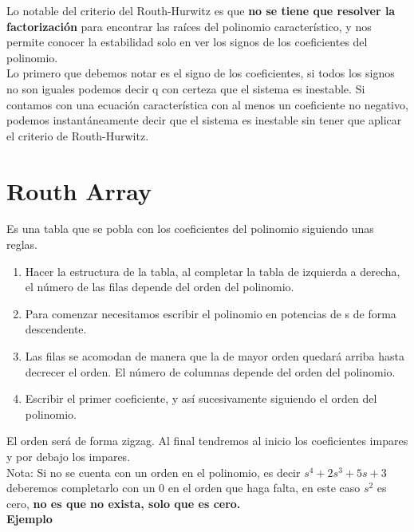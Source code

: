 \documentclass[
	12pt, %
]{fphw}
\begin{document}
Lo notable del criterio del Routh-Hurwitz es que \textbf{no se tiene que resolver la factorización} para encontrar las raíces del polinomio característico, y nos permite conocer la estabilidad solo en ver los signos de los coeficientes del polinomio.\\
Lo primero que debemos notar es el signo de los coeficientes, si todos los signos no son iguales podemos decir q con certeza que el sistema es inestable. 
Si contamos con una ecuación característica con al menos un coeficiente no negativo, podemos instantáneamente decir que el sistema es inestable sin tener que aplicar el criterio de Routh-Hurwitz.

\newpage
\section{Routh Array}

Es una tabla que se pobla con los coeficientes del polinomio siguiendo unas reglas.

\begin{enumerate}
\item{Hacer la estructura de la tabla, al completar la tabla de izquierda a derecha, el número de las filas depende del orden del polinomio.}
\item{Para comenzar necesitamos escribir el polinomio en potencias de s de forma descendente.}
\item{Las filas se acomodan de manera que la de mayor orden quedará arriba hasta decrecer el orden. El número de columnas depende del orden del polinomio.}
\item{Escribir el primer coeficiente, y así sucesivamente siguiendo el orden del polinomio.}
\end{enumerate}

El orden será de forma zigzag. Al final tendremos al inicio los coeficientes impares y por debajo los impares.\\
Nota: Si no se cuenta con un orden en el polinomio, es decir $s^4 + 2s^3 + 5s + 3$ deberemos completarlo con un 0 en el orden que haga falta, en este caso $s^2$ es cero, \textbf{no es que no exista, solo que es cero.}\\

\textbf{Ejemplo}\\\\
\end{document}
